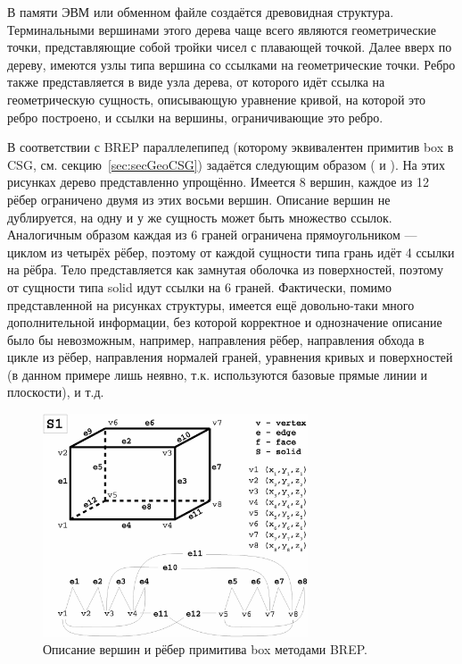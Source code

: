 В памяти ЭВМ или обменном файле создаётся древовидная структура. Терминальными вершинами этого дерева чаще всего являются геометрические точки, представляющие собой тройки чисел с плавающей точкой. Далее вверх по дереву, имеются узлы типа вершина со ссылками на геометрические точки. Ребро также представляется в виде узла дерева, от которого идёт ссылка на геометрическую сущность, описывающую уравнение кривой, на которой это ребро построено, и ссылки на вершины, ограничивающие это ребро.

В соответствии с BREP параллелепипед (которому эквивалентен примитив box в CSG, см. секцию~\ref{sec:secGeoCSG}) задаётся следующим образом ( и ). На этих рисунках дерево представленно упрощённо. Имеется 8 вершин, каждое из 12 рёбер ограничено двумя из этих восьми вершин. Описание вершин не дублируется, на одну и у же сущность может быть множество ссылок. Аналогичным образом каждая из 6 граней ограничена прямоугольником --- циклом из четырёх рёбер, поэтому от каждой сущности типа грань идёт 4 ссылки на рёбра. Тело представляется как замнутая оболочка из поверхностей, поэтому от сущности типа solid идут ссылки на 6 граней. Фактически, помимо представленной на рисунках структуры, имеется ещё довольно-таки много дополнительной информации, без которой корректное и однозначение описание было бы невозможным, например, направления рёбер, направления обхода в цикле из рёбер, направления нормалей граней, уравнения кривых и поверхностей (в данном примере лишь неявно, т.к. используются базовые прямые линии и плоскости), и т.д.

\begin{figure}[H]
\centering
\includegraphics[width=0.7\textwidth]{pictures/BREPbox1.eps}
\caption{Описание вершин и рёбер примитива box методами BREP.}
\label{fig:BREPbox1}
\end{figure}

